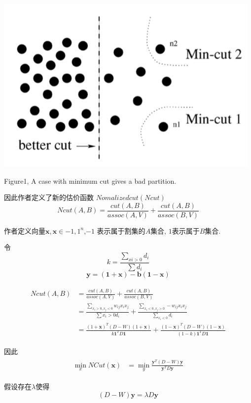 \documentclass[paper=a4, fontsize=11pt]{scrartcl} %
\numberwithin{equation}{section} %
\numberwithin{figure}{section} %
\numberwithin{table}{section} %
\begin{document}
	\includegraphics[scale=0.5]{pic4.png}

	Figure1, A case with minimum cut gives a bad partition.

	因此作者定义了新的估价函数 $Nomalized cut(Ncut)$
	$$Ncut(A, B) = \frac{cut(A, B)}{assoc(A, V)} + \frac{cut(A, B)}{assoc(B, V)}$$

	作者定义向量$\mathbf{x}, \mathbf{x}\in {-1, 1}^n$,$ -1$ 表示属于割集的$A$集合, $1$表示属于$B$集合. 

	令$$k = \frac{\sum_{xi>0} d_i}{\sum d_i}$$
	$$\mathbf{y = (1 + x) - b(1 - x)}$$

	\begin{align}
	\begin{split}
		Ncut(A, B) &= \frac{cut(A, B)}{assoc(A, V)} + \frac{cut(A, B)}{assoc(B, V)}	\\
			&= \frac{\sum_{x_i > 0, x_j < 0} w_{ij} x_i x_j}{\sum{x_i>0}d_i} + \frac{\sum_{x_i < 0, x_j > 0} -w_{ij} x_i x_j}{\sum_{x_i < 0} d_i}\\
			&= \frac{(1+\mathbf{x})^{T}(D-W)(1+\mathbf{x})}{k\mathbf{1}^{T}D\mathbf{1}} + \frac{(1-\mathbf{x})^{T}(D-W)(1-\mathbf{x})}{(1-k)\mathbf{1}^{T}D\mathbf{1}}
	\end{split}
	\end{align}

	因此 
	\begin{align}
	\begin{split}
		\min_{x}NCut(\mathbf{x}) &= \min_{y} \frac{\mathbf{y}^{T}(D-W)\mathbf{y}}{\mathbf{y}^{T}D\mathbf{y}}
	\end{split}
	\end{align}

	假设存在$\lambda$使得
	$$(D-W)\mathbf{y} = \lambda D\mathbf{y}$$
\end{document}
